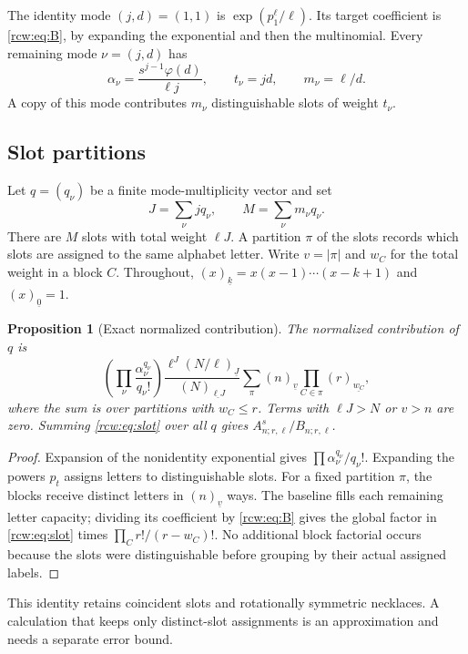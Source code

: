 \documentclass[11pt]{article}
\newtheorem{proposition}[theorem]{Proposition}
\theoremstyle{definition}\newtheorem{definition}[theorem]{Definition}
\theoremstyle{remark}\newtheorem{remark}[theorem]{Remark}
\newcommand{\fall}[2]{(#1)_{\underline{#2}}}
\newcommand{\A}{A^s_{n;r,\ell}}
\newcommand{\B}{B_{n;r,\ell}}
\numberwithin{equation}{section}
\begin{document}
The identity mode $(j,d)=(1,1)$ is $\exp(p_1^\ell/\ell)$. Its target coefficient is \eqref{rcw:eq:B}, by expanding the exponential and then the multinomial. Every remaining mode $\nu=(j,d)$ has
\begin{equation}\label{rcw:eq:modes}
 \alpha_\nu=\frac{s^{j-1}\varphi(d)}{\ell j},\qquad
 t_\nu=jd,\qquad m_\nu=\ell/d.
\end{equation}
A copy of this mode contributes $m_\nu$ distinguishable slots of weight $t_\nu$.

\subsection{Slot partitions}
Let $q=(q_\nu)$ be a finite mode-multiplicity vector and set
\[
 J=\sum_\nu j q_\nu,\qquad M=\sum_\nu m_\nu q_\nu.
\]
There are $M$ slots with total weight $\ell J$. A partition $\pi$ of the slots records which slots are assigned to the same alphabet letter. Write $v=|\pi|$ and $w_C$ for the total weight in a block $C$. Throughout, $\fall{x}{k}=x(x-1)\cdots(x-k+1)$ and $\fall{x}{0}=1$.

\begin{proposition}[Exact normalized contribution]\label{rcw:prop:exact}
The normalized contribution of $q$ is
\begin{equation}\label{rcw:eq:slot}
 \left(\prod_\nu\frac{\alpha_\nu^{q_\nu}}{q_\nu!}\right)
 \frac{\ell^J\fall{N/\ell}{J}}{\fall N{\ell J}}
 \sum_{\pi}\fall nv\prod_{C\in\pi}\fall r{w_C},
\end{equation}
where the sum is over partitions with $w_C\le r$. Terms with $\ell J>N$ or $v>n$ are zero. Summing \eqref{rcw:eq:slot} over all $q$ gives $\A/\B$.
\end{proposition}
\begin{proof}
Expansion of the nonidentity exponential gives $\prod\alpha_\nu^{q_\nu}/q_\nu!$. Expanding the powers $p_t$ assigns letters to distinguishable slots. For a fixed partition $\pi$, the blocks receive distinct letters in $\fall nv$ ways. The baseline fills each remaining letter capacity; dividing its coefficient by \eqref{rcw:eq:B} gives the global factor in \eqref{rcw:eq:slot} times $\prod_C r!/(r-w_C)!$. No additional block factorial occurs because the slots were distinguishable before grouping by their actual assigned labels.
\end{proof}
This identity retains coincident slots and rotationally symmetric necklaces. A calculation that keeps only distinct-slot assignments is an approximation and needs a separate error bound.
\end{document}
